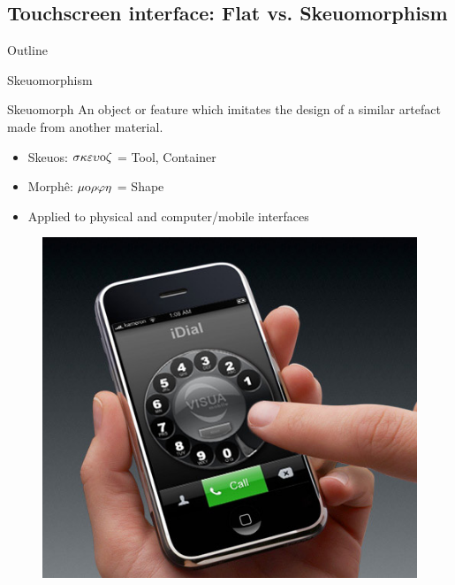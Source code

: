 \documentclass{beamer}
\begin{document}
\subsection{Touchscreen interface: Flat vs. Skeuomorphism}

\begin{frame}{Outline}
\end{frame}

\begin{frame}{Skeuomorphism}
\begin{block}{Skeuomorph}
An object or feature which imitates the design of a similar artefact made from another material.
\end{block}
\begin{itemize}
\item Skeuos: $\sigma \kappa \varepsilon \upsilon {\rm o} \zeta$ = Tool, Container
\item Morphê: $\mu {\rm o} \rho \varphi \eta$ = Shape
\item Applied to physical and computer/mobile interfaces
\end{itemize}
    \begin{figure}
\includegraphics[scale=0.25]{idial.jpg}
\end{figure}


\end{frame}
\end{document}
